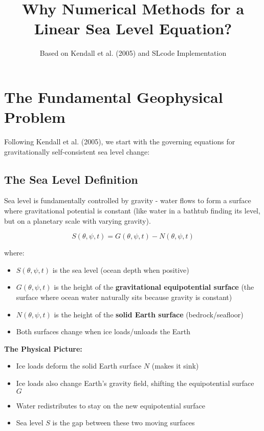 \documentclass{article}
\title{Why Numerical Methods for a Linear Sea Level Equation?}
\author{Based on Kendall et al. (2005) and SLcode Implementation}
\date{}
\begin{document}
\maketitle

\section{The Fundamental Geophysical Problem}

Following Kendall et al. (2005), we start with the governing equations for gravitationally self-consistent sea level change:

\subsection{The Sea Level Definition}
Sea level is fundamentally controlled by gravity - water flows to form a surface where gravitational potential is constant (like water in a bathtub finding its level, but on a planetary scale with varying gravity).

\begin{equation}
S(\theta,\psi, t) = G(\theta,\psi, t) - N(\theta,\psi, t)
\end{equation}

where:
\begin{itemize}
\item $S(\theta,\psi, t)$ is the sea level (ocean depth when positive)
\item $G(\theta,\psi, t)$ is the height of the \textbf{gravitational equipotential surface} (the surface where ocean water naturally sits because gravity is constant)
\item $N(\theta,\psi, t)$ is the height of the \textbf{solid Earth surface} (bedrock/seafloor)
\item Both surfaces change when ice loads/unloads the Earth
\end{itemize}

\textbf{The Physical Picture:}
\begin{itemize}
\item Ice loads deform the solid Earth surface $N$ (makes it sink)
\item Ice loads also change Earth's gravity field, shifting the equipotential surface $G$
\item Water redistributes to stay on the new equipotential surface
\item Sea level $S$ is the gap between these two moving surfaces
\end{itemize}
\end{document}
